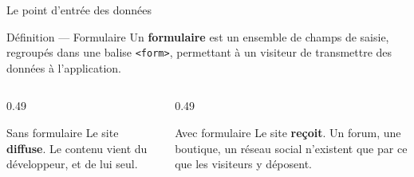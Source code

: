 \documentclass[aspectratio=169,11pt]{beamer}
\begin{document}
\begin{frame}{Le point d'entrée des données}
  \begin{block}{Définition --- Formulaire}
    Un \textbf{formulaire} est un ensemble de champs de saisie, regroupés dans une balise \texttt{<form>}, permettant à un visiteur de transmettre des données à l'application.
  \end{block}
  \vspace{0.3cm}
  \begin{columns}[T]
    \begin{column}{0.49\textwidth}
      \begin{exampleblock}{Sans formulaire}
        Le site \textbf{diffuse}. Le contenu vient du développeur, et de lui seul.
      \end{exampleblock}
    \end{column}
    \begin{column}{0.49\textwidth}
      \begin{exampleblock}{Avec formulaire}
        Le site \textbf{reçoit}. Un forum, une boutique, un réseau social n'existent que par ce que les visiteurs y déposent.
      \end{exampleblock}
    \end{column}
  \end{columns}
\end{frame}
\end{document}
